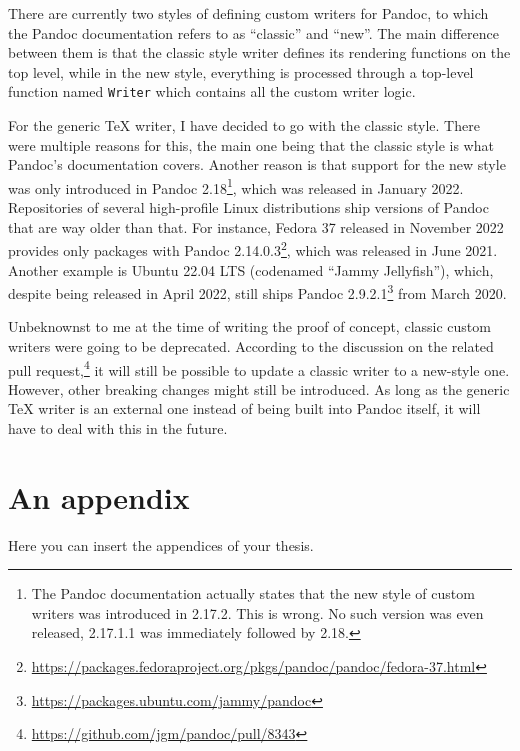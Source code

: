 \documentclass[
  digital,     %
  oneside,     %
  nosansbold,  %
  nocolorbold, %
  lof,         %
  nolot,       %
]{fithesis4}
\begin{document}
There are currently two styles of defining custom writers for Pandoc, to which the Pandoc documentation refers to as ``classic'' and ``new''. The main difference between them is that the classic style writer defines its rendering functions on the top level, while in the new style, everything is processed through a top-level function named \texttt{Writer} which contains all the custom writer logic.

For the generic \TeX{} writer, I have decided to go with the classic style. There were multiple reasons for this, the main one being that the classic style is what Pandoc's documentation covers. Another reason is that support for the new style was only introduced in Pandoc 2.18\footnote{The Pandoc documentation actually states that the new style of custom writers was introduced in 2.17.2. This is wrong. No such version was even released, 2.17.1.1 was immediately followed by 2.18.}, which was released in January 2022. Repositories of several high-profile Linux distributions ship versions of Pandoc that are way older than that. For instance, Fedora 37 released in November 2022 provides only packages with Pandoc 2.14.0.3\footnote{\url{https://packages.fedoraproject.org/pkgs/pandoc/pandoc/fedora-37.html}}, which was released in June 2021. Another example is Ubuntu 22.04 LTS (codenamed ``Jammy Jellyfish''), which, despite being released in April 2022, still ships Pandoc 2.9.2.1\footnote{\url{https://packages.ubuntu.com/jammy/pandoc}} from March 2020.

Unbeknownst to me at the time of writing the proof of concept, classic custom writers were going to be deprecated. According to the discussion on the related pull request,\footnote{\url{https://github.com/jgm/pandoc/pull/8343}} it will still be possible to update a classic writer to a new-style one. However, other breaking changes might still be introduced. As long as the generic \TeX{} writer is an external one instead of being built into Pandoc itself, it will have to deal with this in the future.

\printbibliography[heading=bibintoc] %

\makeatletter\thesis@blocks@clear\makeatother
{} %
\printindex

\appendix %
\chapter{An appendix}
Here you can insert the appendices of your thesis.
\end{document}
